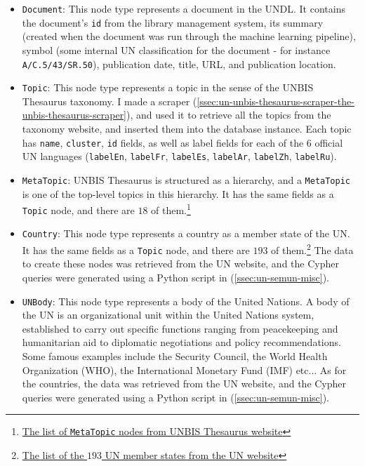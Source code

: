 \begin{itemize}
      \item \texttt{Document}:
            This node type represents a document in the UNDL. It contains the document's \texttt{id} from the library management system, its summary (created when the document was run through the machine learning pipeline), symbol (some internal UN classification for the document - for instance \texttt{A/C.5/43/SR.50}), publication date, title, URL, and publication location.

      \item \texttt{Topic}:
            This node type represents a topic in the sense of the UNBIS Thesaurus taxonomy. I made a scraper  (\ref{ssec:un-unbis-thesaurus-scraper-the-unbis-thesaurus-scraper}), and used it to retrieve all the topics from the taxonomy website, and inserted them into the database instance. Each topic has \texttt{name}, \texttt{cluster}, \texttt{id} fields, as well as label fields for each of the $6$ official UN languages (\texttt{labelEn}, \texttt{labelFr}, \texttt{labelEs}, \texttt{labelAr}, \texttt{labelZh}, \texttt{labelRu}).

      \item \texttt{MetaTopic}:
            UNBIS Thesaurus is structured as a hierarchy, and a \texttt{MetaTopic} is one of the top-level topics in this hierarchy. It has the same fields as a \texttt{Topic} node, and there are $18$ of them.\footnote{\href{https://metadata.un.org/thesaurus/?lang=en}{The list of \texttt{MetaTopic} nodes from UNBIS Thesaurus website}}

      \item \texttt{Country}:
            This node type represents a country as a member state of the UN. It has the same fields as a \texttt{Topic} node, and there are $193$ of them.\footnote{\href{https://www.un.org/en/about-us/member-states}{The list of the $193$ UN member states from the UN website}} The data to create these nodes was retrieved from the UN website, and the Cypher queries were generated using a Python script in  (\ref{ssec:un-semun-misc}).

      \item \texttt{UNBody}:
            This node type represents a body of the United Nations. A body of the UN is an organizational unit within the United Nations system, established to carry out specific functions ranging from peacekeeping and humanitarian aid to diplomatic negotiations and policy recommendations. Some famous examples include the Security Council, the World Health Organization (WHO), the International Monetary Fund (IMF) etc... As for the countries, the data was retrieved from the UN website, and the Cypher queries were generated using a Python script in  (\ref{ssec:un-semun-misc}).


\end{itemize}


